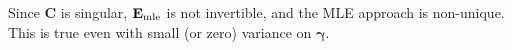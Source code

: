 \documentclass[a4paper, 11pt]{article}
\newcommand{\R}{\mathbb{R}}
\newcommand{\1}{\mathbf{1}}
\DeclareMathOperator*{\argmin}{argmin}
\newcommand{\PFS}{\mathpzc{P}}
\newcommand{\xb}{\mathbf{x}}
\newcommand{\Cb}{\mathbf{C}}
\newcommand{\gammab}{{\bm \gamma}}
\newcommand{\betab}{\bm{\beta}}
\newcommand{\Lambdab}{\bm{\Lambda}}
\newcommand{\betamlefs}{{\betab}_{\textnormal{mle}}}
\newcommand{\betamlefssumcon}{\tilde{\betab}^\ast_{\textnormal{mle}}}
\newcommand{\emlefs}{\mathbf{E}_{\textnormal{mle}}}
\begin{document}
{	%
	Since $\mathbf{C}$ is singular, $\emlefs$ is not invertible, and the MLE approach is non-unique. This is true even with small (or zero) variance on  $\gammab$.
	
	
}
\end{document}
